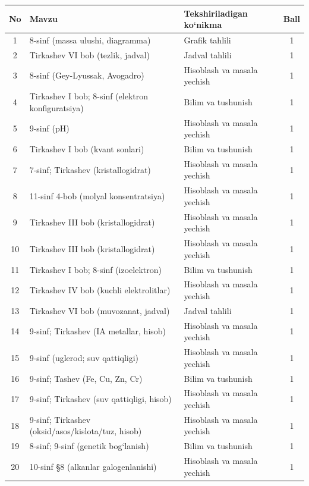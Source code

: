 \documentclass[11pt,a4paper]{article}
\begin{document}
{\small\noindent\begin{longtable}{|c|p{7.2cm}|p{5.4cm}|c|}\hline \textbf{No} & \textbf{Mavzu} & \textbf{Tekshiriladigan ko`nikma} & \textbf{Ball}\\\hline
1 & 8-sinf (massa ulushi, diagramma) & Grafik tahlili & 1\\\hline
2 & Tirkashev VI bob (tezlik, jadval) & Jadval tahlili & 1\\\hline
3 & 8-sinf (Gey-Lyussak, Avogadro) & Hisoblash va masala yechish & 1\\\hline
4 & Tirkashev I bob; 8-sinf (elektron konfiguratsiya) & Bilim va tushunish & 1\\\hline
5 & 9-sinf (pH) & Hisoblash va masala yechish & 1\\\hline
6 & Tirkashev I bob (kvant sonlari) & Bilim va tushunish & 1\\\hline
7 & 7-sinf; Tirkashev (kristallogidrat) & Hisoblash va masala yechish & 1\\\hline
8 & 11-sinf 4-bob (molyal konsentratsiya) & Hisoblash va masala yechish & 1\\\hline
9 & Tirkashev III bob (kristallogidrat) & Hisoblash va masala yechish & 1\\\hline
10 & Tirkashev III bob (kristallogidrat) & Hisoblash va masala yechish & 1\\\hline
11 & Tirkashev I bob; 8-sinf (izoelektron) & Bilim va tushunish & 1\\\hline
12 & Tirkashev IV bob (kuchli elektrolitlar) & Hisoblash va masala yechish & 1\\\hline
13 & Tirkashev VI bob (muvozanat, jadval) & Jadval tahlili & 1\\\hline
14 & 9-sinf; Tirkashev (IA metallar, hisob) & Hisoblash va masala yechish & 1\\\hline
15 & 9-sinf (uglerod; suv qattiqligi) & Hisoblash va masala yechish & 1\\\hline
16 & 9-sinf; Tashev (Fe, Cu, Zn, Cr) & Bilim va tushunish & 1\\\hline
17 & 9-sinf; Tirkashev (suv qattiqligi, hisob) & Hisoblash va masala yechish & 1\\\hline
18 & 9-sinf; Tirkashev (oksid/asos/kislota/tuz, hisob) & Hisoblash va masala yechish & 1\\\hline
19 & 8-sinf; 9-sinf (genetik bog`lanish) & Bilim va tushunish & 1\\\hline
20 & 10-sinf \S{}8 (alkanlar galogenlanishi) & Hisoblash va masala yechish & 1\\\hline

\end{longtable}}
\end{document}
